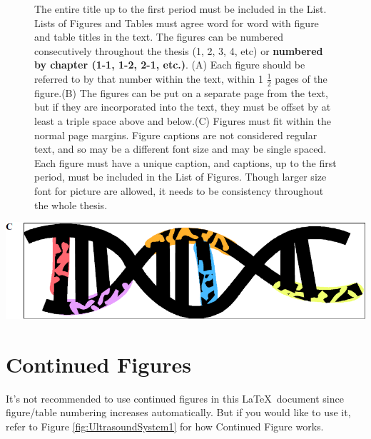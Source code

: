 \begin{figure}[!htb]
\begin{minipage}{0.45\textwidth}
\begin{center}
			\end{center}	
	\end{minipage}
	\caption[\protect\vspace{-2.8ex}{The Entire Title Up To The First Period Must Be Included In The List.}]{The entire title up to the first period must be included in the List. Lists of Figures and Tables must agree word for word with figure and table titles in the text. The figures can be numbered consecutively throughout the thesis (1, 2, 3, 4, etc) or \textbf{numbered by chapter (1-1, 1-2, 2-1, etc.)}. (A) Each figure should be referred to by that number within the text, within 1 $\frac{1}{2}$ pages of the figure.(B) The figures can be put on a separate page from the text, but if they are incorporated into the text, they must be offset by at least a triple space above and below.(C) Figures must fit within the normal page margins. Figure captions are not considered regular text, and so may be a different font size and may be single spaced. Each figure must have a unique caption, and captions, up to the first period, must be included in the List of Figures. Though larger size font for picture are allowed, it needs to be consistency throughout the whole thesis.}
	\label{fig:exampleA}
\end{figure}
		

\begin{Contfigure}[!htb]
\captionsetup{list=off}	%
\begin{center}
\includegraphics[width=\textwidth]{graphic/TAMUthesis_exampleC.png}
\caption{}
\label{fig:exampleC}
\end{center}
\end{Contfigure}
\renewcommand{\thefigure}{\arabic{chapter}.\arabic{figure} }

\section{Continued Figures}
It's not recommended to use continued figures in this \LaTeX ~document since figure/table numbering increases automatically. But if you would like to use it, refer to Figure \ref{fig:UltrasoundSystem1} for how Continued Figure works.
 
